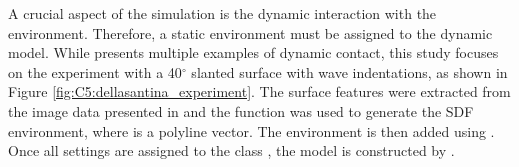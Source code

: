 A crucial aspect of the simulation is the dynamic interaction with the environment. Therefore, a static environment must be assigned to the dynamic model. While \cite{DellaSantina2020a} presents multiple examples of dynamic contact, this study focuses on the experiment with a 40$^\circ$ slanted surface with wave indentations, as shown in Figure \ref{fig:C5:dellasantina_experiment}. The surface features were extracted from the image data presented in \cite{DellaSantina2020a} and the  function was used to generate the SDF environment, where  is a polyline vector. The environment is then added using . Once all settings are assigned to the class , the model is constructed by . %




